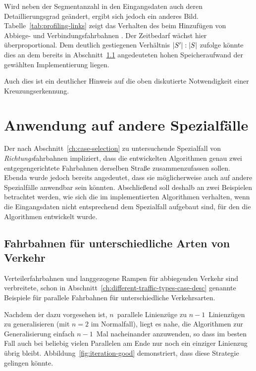 \documentclass[../main/thesis.tex]{subfiles}
\begin{document}
Wird neben der Segmentanzahl in den Eingangsdaten auch deren Detaillierungsgrad geändert, ergibt sich jedoch ein anderes Bild.
Tabelle~\ref{tab:profiling-links} zeigt das Verhalten des  beim Hinzufügen von Abbiege- und Verbindungsfahrbahnen .
Der Zeitbedarf wächst hier überproportional.
Dem deutlich gestiegenen Verhältnis $|S'|\nobreak:\nobreak|S|$ zufolge könnte dies an dem bereits in Abschnitt~\ref{} angedeuteten hohen Speicheraufwand der gewählten Implementierung liegen.

Auch dies ist ein deutlicher Hinweis auf die oben diskutierte Notwendigkeit einer Kreuzungserkennung.




\section{Anwendung auf andere Spezialfälle}
\label{ch:result-other-cases}

Der nach Abschnitt~\ref{ch:case-selection} zu untersuchende Spezialfall von \emph{Richtungs}fahrbahnen impliziert, dass die entwickelten Algorithmen genau zwei entgegengerichtete Fahrbahnen derselben Straße zusammenzufassen sollen.
Ebenda wurde jedoch bereits angedeutet, dass sie möglicherweise auch auf andere Spezialfälle anwendbar sein könnten.
Abschließend soll deshalb an zwei Beispielen betrachtet werden, wie sich die im  implementierten Algorithmen verhalten, wenn die Eingangsdaten nicht entsprechend dem Spezialfall aufgebaut sind, für den die Algorithmen entwickelt wurde.



\subsection{Fahrbahnen für unterschiedliche Arten von Verkehr}

Verteilerfahrbahnen und langgezogene Rampen für abbiegenden Verkehr sind verbreitete, schon in Abschnitt~\ref{ch:different-traffic-types-case-desc} genannte Beispiele für parallele Fahrbahnen für unterschiedliche Verkehrsarten.

Nachdem der  dazu vorgesehen ist, $n$~parallele Linienzüge zu $n-1$~Linienzügen zu generalisieren (mit $n=2$ im Normalfall), liegt es nahe, die Algorithmen zur Generalisierung einfach $n-1$~Mal nacheinander anzuwenden, so dass im besten Fall auch bei beliebig vielen Parallelen am Ende nur noch ein einziger Linienzug übrig bleibt.
Abbildung~\ref{fig:iteration-good} demonstriert, dass diese Strategie gelingen könnte.
\end{document}
